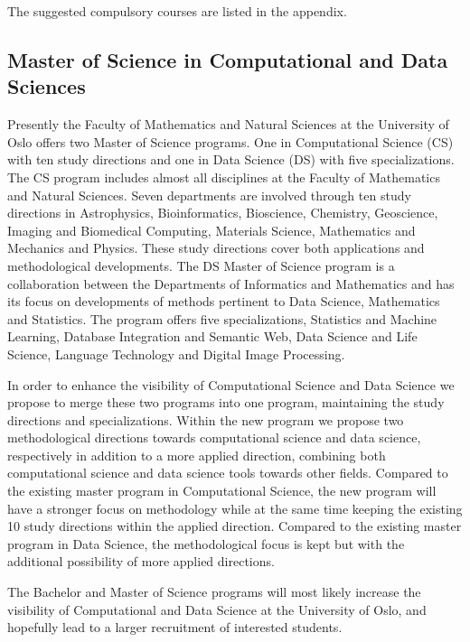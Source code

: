 \documentclass[oneside,final,10pt]{article}
\begin{document}
The suggested compulsory courses are listed in the appendix.

\subsection*{Master of Science in Computational and Data Sciences}

Presently the Faculty of Mathematics and Natural Sciences at the University of Oslo offers two Master of Science programs. One in Computational Science (CS) with ten study directions and one in Data Science (DS) with five specializations. The CS program includes almost all disciplines at the Faculty of Mathematics and Natural Sciences. Seven departments are involved through ten study directions in Astrophysics, Bioinformatics, Bioscience, Chemistry, Geoscience, Imaging and Biomedical Computing, Materials Science, Mathematics and Mechanics and Physics. These study directions cover both applications and methodological developments. The DS Master of Science program is a collaboration between the Departments of Informatics and Mathematics and has its focus on developments of methods pertinent to Data Science, Mathematics  and Statistics.  
The program offers five specializations, 
Statistics and Machine Learning, Database Integration and Semantic Web, 
Data Science and Life Science, Language Technology and Digital Image Processing. 


In order to enhance the visibility of Computational Science and Data Science we propose to merge these two programs into one program, maintaining the study directions and specializations. Within the new program we propose two methodological directions towards computational science and data science, respectively in addition to a more applied direction, combining both computational science and data science tools towards other fields. Compared to the existing master program in Computational Science, the new program will have a stronger focus on methodology while at the same time keeping the existing 10 study directions within the applied direction. Compared to the existing master program in Data Science, the methodological focus is kept but with the additional possibility of more applied directions.

The Bachelor and Master of Science programs
will most likely increase the visibility of Computational and Data Science at the University of Oslo, and hopefully lead to a larger recruitment of interested students. 

\end{document}
